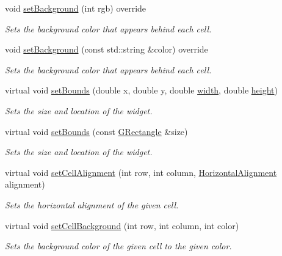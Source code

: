 \begin{DoxyCompactItemize}
void \mbox{\hyperlink{classsgl_1_1GTable_aefbd30fa3e699d49b6dd2c2a2d6e8c2b}{set\+Background}} (int rgb) override
\begin{DoxyCompactList}\small\item\em Sets the background color that appears behind each cell. \end{DoxyCompactList}\item 
void \mbox{\hyperlink{classsgl_1_1GTable_a9cb99695b93494c7ba28268ce9e42c2a}{set\+Background}} (const std\+::string \&color) override
\begin{DoxyCompactList}\small\item\em Sets the background color that appears behind each cell. \end{DoxyCompactList}\item 
virtual void \mbox{\hyperlink{classsgl_1_1GInteractor_a2aae8197624b72265ab83b4f1bc73f2f}{set\+Bounds}} (double x, double y, double \mbox{\hyperlink{classsgl_1_1GTable_ad72663daf610f2a0833a2fc3d78e4fdf}{width}}, double \mbox{\hyperlink{classsgl_1_1GTable_ad3774f6419003470f54fd495124ef51f}{height}})
\begin{DoxyCompactList}\small\item\em Sets the size and location of the widget. \end{DoxyCompactList}\item 
virtual void \mbox{\hyperlink{classsgl_1_1GInteractor_acada386653f008cacc7cce86426bef7c}{set\+Bounds}} (const \mbox{\hyperlink{structsgl_1_1GRectangle}{G\+Rectangle}} \&size)
\begin{DoxyCompactList}\small\item\em Sets the size and location of the widget. \end{DoxyCompactList}\item 
virtual void \mbox{\hyperlink{classsgl_1_1GTable_a0c1ff398e920da7356b8375b66b9b083}{set\+Cell\+Alignment}} (int row, int column, \mbox{\hyperlink{namespacesgl_aa00e70829e72ff16addc4d9f06fe3bc5}{Horizontal\+Alignment}} alignment)
\begin{DoxyCompactList}\small\item\em Sets the horizontal alignment of the given cell. \end{DoxyCompactList}\item 
virtual void \mbox{\hyperlink{classsgl_1_1GTable_a50940b22e500a861451bbff938c8f50b}{set\+Cell\+Background}} (int row, int column, int color)
\begin{DoxyCompactList}\small\item\em Sets the background color of the given cell to the given color. \end{DoxyCompactList}\item 

\end{DoxyCompactItemize}
